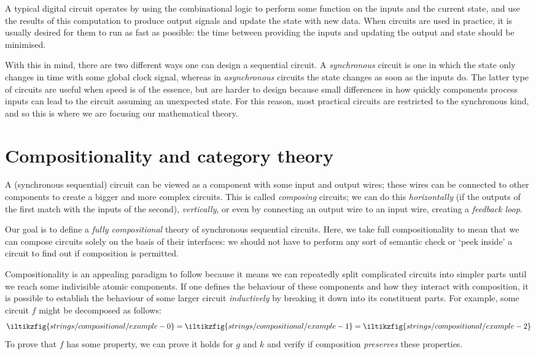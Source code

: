 A typical digital circuit operates by using the combinational logic to perform
some function on the inputs and the current state, and use the results of this
computation to produce output signals and update the state with new data.
When circuits are used in practice, it is usually desired for them to run as
fast as possible: the time between providing the inputs and updating the
output and state should be minimised.

With this in mind, there are two different ways one can design a sequential
circuit.
A \emph{synchronous} circuit is one in which the state only changes in time with
some global clock signal, whereas in \emph{asynchronous} circuits the state
changes as soon as the inputs do.
The latter type of circuits are useful when speed is of the essence, but are
harder to design because small differences in how quickly components process
inputs can lead to the circuit assuming an unexpected state.
For this reason, most practical circuits are restricted to the synchronous
kind, and so this is where we are focusing our mathematical theory.

\section{Compositionality and category theory}

A (synchronous sequential) circuit can be viewed as a component with some
input and output wires; these wires can be connected to other components to
create a bigger and more complex circuits.
This is called \emph{composing} circuits; we can do this
\emph{horizontally} (if the outputs of the first match with the inputs of the
second), \emph{vertically}, or even by connecting an output wire to an input
wire, creating a \emph{feedback loop}.

\begin{center}
    \qquad
    \qquad
\end{center}

Our goal is to define a \emph{fully compositional} theory of synchronous
sequential circuits.
Here, we take full compositionality to mean that we can compose circuits solely
on the basis of their interfaces: we should not have to perform any sort of
semantic check or `peek inside' a circuit to find out if composition is
permitted.

Compositionality is an appealing paradigm to follow because it means we can
repeatedly split complicated circuits into simpler parts until we reach some
indivisible atomic components.
If one defines the behaviour of these components and how they interact
with composition, it is possible to establish the behaviour of some
larger circuit \emph{inductively} by breaking it down into its constituent
parts.
For example, some circuit \(f\) might be decomposed as follows:
\[
    \iltikzfig{strings/compositional/example-0}
    =
    \iltikzfig{strings/compositional/example-1}
    =
    \iltikzfig{strings/compositional/example-2}
\]
To prove that \(f\) has some property, we can prove it holds for \(g\) and \(k\)
and verify if composition \emph{preserves} these properties.

